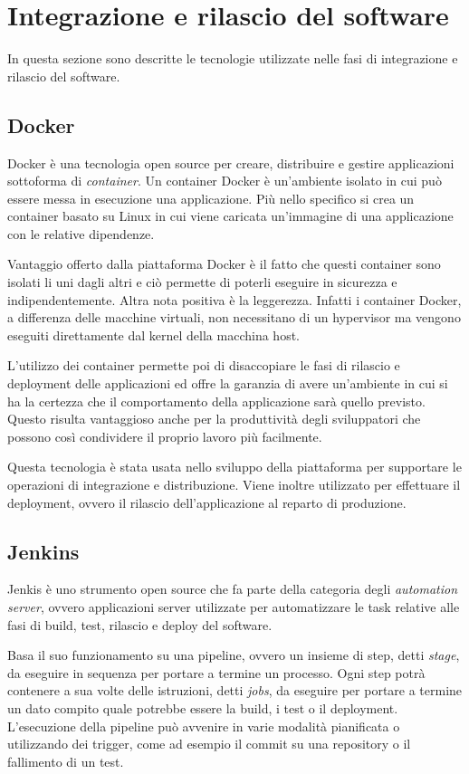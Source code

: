 \section{Integrazione e rilascio del software}
In questa sezione sono descritte le tecnologie utilizzate nelle fasi di integrazione e rilascio del software.

\subsection{Docker}
Docker \cite{Docker} è una tecnologia open source per creare, distribuire e gestire applicazioni sottoforma di \textit{container}.
Un container Docker è un'ambiente isolato in cui può essere messa in esecuzione una applicazione.
Più nello specifico si crea un container basato su Linux in cui viene caricata un'immagine di una applicazione con le relative dipendenze.

Vantaggio offerto dalla piattaforma Docker è il fatto che questi container sono isolati li uni dagli altri
e ciò permette di poterli eseguire in sicurezza e indipendentemente.
Altra nota positiva è la leggerezza. Infatti i container Docker, a differenza delle macchine virtuali, non necessitano
di un hypervisor ma vengono eseguiti direttamente dal kernel della macchina host.

L'utilizzo dei container permette poi di disaccopiare le fasi di rilascio e deployment delle applicazioni ed offre la garanzia
di avere un'ambiente in cui si ha la certezza che il comportamento della applicazione sarà quello previsto. Questo risulta
vantaggioso anche per la produttività degli sviluppatori che possono così condividere
il proprio lavoro più facilmente.

Questa tecnologia è stata usata nello sviluppo della piattaforma per supportare le operazioni di integrazione e distribuzione.
Viene inoltre utilizzato per effettuare il deployment, ovvero il rilascio dell'applicazione al reparto di produzione.

\subsection{Jenkins}
Jenkis \cite{Jenkins} è uno strumento open source che fa parte della categoria degli \textit{automation server}, ovvero applicazioni server utilizzate
per automatizzare le task relative alle fasi di build, test, rilascio e deploy del software.

Basa il suo funzionamento su una pipeline, ovvero un insieme di step, detti \textit{stage}, da eseguire in sequenza per portare a termine un processo.
Ogni step potrà contenere a sua volte delle istruzioni, detti \textit{jobs}, da eseguire per portare a termine un dato compito quale potrebbe essere la build, i test o il deployment.
L'esecuzione della pipeline può avvenire in varie modalità pianificata o utilizzando dei trigger, come ad esempio il commit su una repository o il fallimento di un test.
